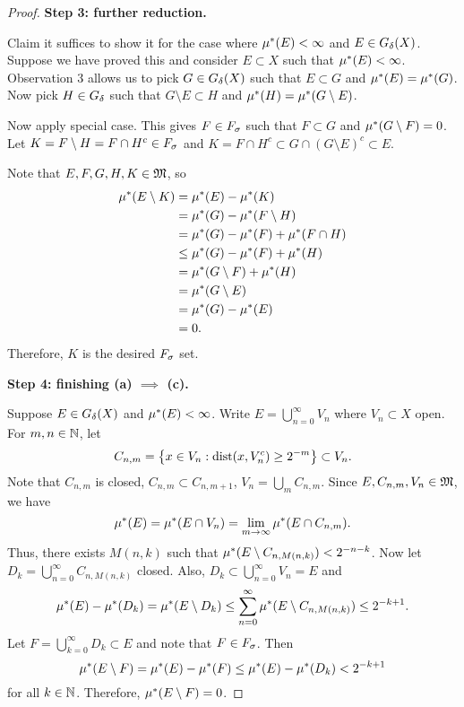 \documentclass[a4paper]{article}
\renewcommand{\cupinfn}{\bigcup_{n=0}^\infty}
\renewcommand{\suminfn}{\sum_{n=0}^\infty}
\renewcommand{\cupinfk}{\bigcup_{k=0}^\infty}
\begin{document}
\begin{proof}
\textbf{Step 3: further reduction.}

Claim it suffices to show it for the case where $\mu^*(E) < \infty$
and $E \in G_\delta(X)$. Suppose we have proved this and consider
$E \subset X$ such that $\mu^*(E) < \infty$. Observation 3
allows us to pick $G \in G_\delta(X)$ such that $E \subset G$
and $\mu^*(E) = \mu^*(G)$. Now pick $H \in G_\delta$ such that $G \setminus E \subset H$
and $\mu^*(H) = \mu^*(G \setminus E)$.

Now apply special case. This gives $F \in F_\sigma$ such that
$F \subset G$ and $\mu^*(G \setminus F) = 0$. Let $K = F \setminus H
= F \cap H^c \in F_\sigma$ and $K = F \cap H^c \subset
G \cap (G \setminus E)^c \subset E$.

Note that $E, F, G, H, K \in \mathfrak{M}$, so
\[
\begin{aligned}
\mu^*(E \setminus K)
&= \mu^*(E) - \mu^*(K) \\
&= \mu^*(G) - \mu^*(F \setminus H) \\
&= \mu^*(G) - \mu^*(F) + \mu^*(F \cap H) \\
&\leq \mu^*(G) - \mu^*(F) + \mu^*(H) \\
&= \mu^*(G \setminus F) + \mu^*(H)  \\
&= \mu^*(G \setminus E) \\
&= \mu^*(G) - \mu^*(E) \\
&= 0.
\end{aligned}
\]
Therefore, $K$ is the desired $F_\sigma$ set.

\textbf{Step 4: finishing (a) $\implies$ (c). }

Suppose $E \in G_\delta(X)$ and $\mu^*(E) < \infty$.
Write $E = \cupinfn V_n$ where $V_n \subset X$ open.
For $m, n \in \mathbb{N}$, let
\[
C_{n, m} = \left\{ x \in V_n: \operatorname{dist}(x, V_n^c) \geq 2^{-m} \right\}
\subset V_n.
\]
Note that $C_{n, m}$ is closed, $C_{n, m} \subset C_{n, m+1}$,
$V_n = \bigcup_{m} C_{n, m}$. Since $E, C_{n, m}, V_n \in \mathfrak{M}$,
we have
\[
\mu^*(E) = \mu^*(E \cap V_n) = \lim_{m \to \infty} \mu^*(E
\cap C_{n, m}).
\]
Thus, there exists $M(n, k)$ such that
$\mu^*(E \setminus C_{n, M(n, k)}) < 2^{-n-k}$.
Now let $D_k = \cupinfn C_{n, M(n, k)}$ closed.
Also, $D_k \subset \cupinfn V_n = E$ and
\[
\om(E) - \om(D_k) = \om(E \setminus D_k)
\leq \suminfn \om(E \setminus C_{n, M(n, k)}) \leq 2^{-k+1}.
\]
Let $F = \cupinfk D_k \subset E$ and note that $F \in F_\sigma$.
Then
\[
\mu^*(E \setminus F) = \mu^*(E) - \mu^*(F)
\leq \mu^*(E) - \mu^*(D_k) < 2^{-k+1}
\]
for all $k \in \mathbb{N}$. Therefore, $\mu^*(E \setminus F) = 0$.


\end{proof}
\end{document}
